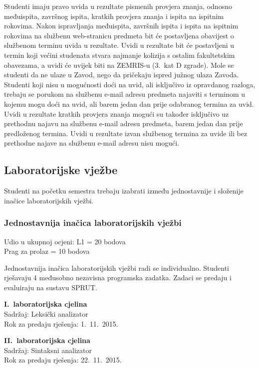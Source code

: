 \documentclass[times, 12pt, utf8]{book}
\begin{document}
Studenti imaju pravo uvida u rezultate pismenih provjera znanja, odnosno međuispita, završnog ispita, kratkih provjera znanja i ispita na ispitnim rokovima.
Nakon ispravljanja međuispita, završnih ispita i ispita na ispitnim rokovima na službenu web-stranicu predmeta bit će postavljena obavijest o službenom terminu uvida u rezultate.
Uvidi u rezultate bit će postavljeni u termin koji većini studenata stvara najmanje kolizija s ostalim fakultetskim obavezama, a uvidi će uvijek biti na ZEMRIS-u (3.~kat D zgrade).
Mole se studenti da ne ulaze u Zavod, nego da pričekaju ispred južnog ulaza Zavoda.
Studenti koji nisu u mogućnosti doći na uvid, ali isključivo iz opravdanog razloga, trebaju se porukom na službenu e-mail adresu predmeta najaviti s terminom u kojemu mogu doći na uvid, ali barem jedan dan prije odabranog termina za uvid.
Uvidi u rezultate kratkih provjera znanja mogući su također isključivo uz prethodnu najavu na službenu e-mail adresu predmeta, barem jedan dan prije predloženog termina.
Uvidi u rezultate izvan službenog termina za uvide ili bez prethodne najave na službenu e-mail adresu nisu mogući.

\cleardoublepage  
{}  
{}
\subsection*{Laboratorijske vježbe}

Studenti na početku semestra trebaju izabrati između jednostavnije i složenije inačice laboratorijskih vježbi.

\subsubsection{Jednostavnija inačica laboratorijskih vježbi}
Udio u ukupnoj ocjeni: L1 = 20 bodova \\
Prag za prolaz = 10 bodova

Jednostavnija inačica laboratorijskih vježbi radi se individualno.
Studenti rješavaju 4 međusobno nezavisna programska zadatka.
Zadaci se predaju i evaluiraju na sustavu SPRUT.

\textbf{I.~laboratorijska cjelina} \\
Sadržaj: Leksički analizator \\
Rok za predaju rješenja: 1.~11.~2015.

\textbf{II.~laboratorijska cjelina} \\
Sadržaj: Sintaksni analizator \\
Rok za predaju rješenja: 22.~11.~2015.
\end{document}
